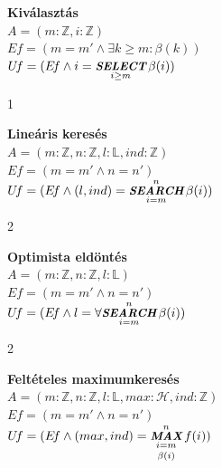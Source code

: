 \documentclass[a4paper,12pt]{article}
\newcommand{\lv}{{:}}
\DeclareMathOperator*{\SEARCH}{\textit{\small \textbf{SEARCH}}}
\DeclareMathOperator*{\SELECT}{\textit{\small \textbf{SELECT}}}
\DeclareMathOperator*{\MAX}{\textit{\small \textbf{MAX}}}
\begin{document}
\bigskip

\textbf{Kiválasztás}\\
\medskip
$A = (m\lv\mathbb{Z}, i\lv\mathbb{Z})$\\[2pt]
$E\!f = ( m=m' \land \exists k \ge m\colon \beta(k) )$\\[6pt]
$U\!f = (E\!f \land i = \SELECT\limits_{i\ge m}^{} \beta(i))$

\medskip
\begin{stuki}[4cm]
  \begin{WHILE}{1}{}
  \end{WHILE}
\end{stuki}
\bigskip

\textbf{Lineáris keresés}\\
\medskip
$A = (m\lv\mathbb{Z}, n\lv\mathbb{Z}, l\lv\mathbb{L}, ind\lv\mathbb{Z})$\\[2pt]
$E\!f = ( m=m' \land n=n' )$\\[6pt]
$U\!f = (E\!f \land (l,ind) = \SEARCH\limits_{i=m}^{n} \beta(i))$

\medskip
\begin{stuki}
  \begin{WHILE}{2}{}
  \end{WHILE}
\end{stuki}
\bigskip

\textbf{Optimista eldöntés}\\
\medskip
$A = (m\lv\mathbb{Z}, n\lv\mathbb{Z}, l\lv\mathbb{L})$\\[2pt]
$E\!f = (m=m' \land n=n')$\\[6pt]
$U\!f = (E\!f \land l = \forall\!\SEARCH\limits_{i=m}^{n} \beta(i))$

\medskip
\begin{stuki}
  \begin{WHILE}{2}{}
  \end{WHILE}
\end{stuki}
\bigskip

\textbf{Feltételes maximumkeresés}\\
\medskip
$A = (m\lv\mathbb{Z}, n\lv\mathbb{Z}, l\lv\mathbb{L}, max\lv\mathcal{H}, ind\lv\mathbb{Z})$\\[2pt]
$E\!f = (m=m' \land n=n')$\\[6pt]
$U\!f = (E\!f \land (max,ind) = \MAX\limits_{\substack{i=m\\[2pt] \beta(i)}}^{n} f(i))$
\end{document}
